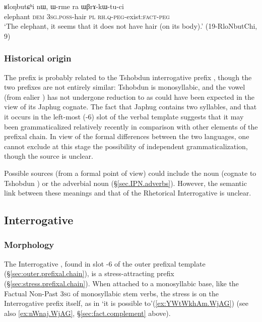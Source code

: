\begin{exe}
\ex \label{ex:WBrAkWtuci}
 \gll ʁloŋbutɕʰi nɯ, ɯ-rme ra ɯβrɤ-kɯ-tu-ci \\
 elephant \textsc{dem} \textsc{3sg}.\textsc{poss}-hair \textsc{pl} \textsc{rh}.\textsc{q}-\textsc{peg}-exist:\textsc{fact}-\textsc{peg} \\
\glt `The elephant, it seems that it does not have hair (on its body).' (19-RloNbutChi, 9)
\end{exe}


\subsubsection{Historical origin} \label{sec:WBrA.history}
The prefix  is probably related to the Tshobdun interrogative prefix   \citep[397]{jackson19tshobdun}, though the two prefixes are not entirely similar: Tshobdun  is monosyllabic, and the vowel  (from ealier ) has not undergone reduction to  as could have been expected in the view of its Japhug cognate. The fact that Japhug  contains two syllables, and that it occurs in the left-most (-6) slot of the verbal template suggests that it may been grammaticalized relatively recently in comparison with other elements of the prefixal chain. In view of the formal differences between the two languages, one cannot exclude at this stage the possibility of independent grammaticalization, though the source is unclear. 

Possible sources (from a formal point of view) could include the noun  (cognate to Tshobdun ) or the  adverbial noun  (§\ref{sec.IPN.adverbs}). However, the semantic link between these meanings and that of the Rhetorical Interrogative is unclear. 

 \subsection{Interrogative} \label{sec:interrogative.W} 
 \subsubsection{Morphology} \label{sec:interrogative.W.morpho} 
 The Interrogative , found in slot -6 of the outer prefixal template (§\ref{sec:outer.prefixal.chain}), is a stress-attracting prefix (§\ref{sec:stress.prefixal.chain}). When attached to a monosyllabic base, like the Factual Non-Past \textsc{3sg} of monosyllabic stem verbs, the stress is on the Interrogative prefix itself, as in  `it is possible to'(\ref{ex:YWtWkhAm.WjAG}) (see also \ref{ex:nWnaj.WjAG}, §\ref{sec:fact.complement} above).
 

